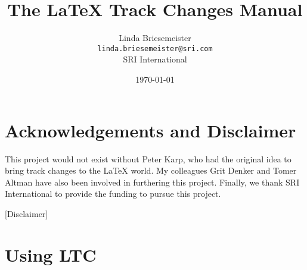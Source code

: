 \documentclass[twoside]{report}
\title{The \LaTeX{} Track Changes Manual \version}
\author{%
Linda Briesemeister\\
\texttt{linda.briesemeister@sri.com}\\
SRI International
}
\date{\today}
\begin{document}
\maketitle

\tableofcontents

\chapter*{Acknowledgements and Disclaimer}

This project would not exist without Peter Karp, who had the original idea to bring track changes to the LaTeX world.  My colleagues Grit Denker and Tomer Altman have also been involved in furthering this project.  Finally, we thank SRI International to provide the funding to pursue this project.

[Disclaimer]




\chapter{Using LTC}
\lipsum[9]







%


\end{document}

